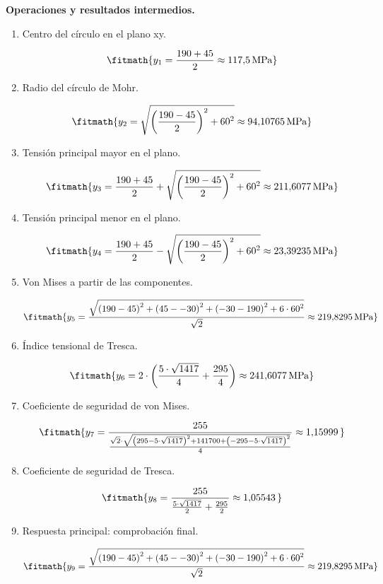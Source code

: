 \noindent\textbf{Operaciones y resultados intermedios.}

\begin{enumerate}

\item Centro del círculo en el plano xy.

\[\fitmath{y_{1}=\frac{190+45}{2}\approx 117{,}5\,\mathrm{MPa}}\]

\item Radio del círculo de Mohr.

\[\fitmath{y_{2}=\sqrt{{\left(\frac{190-45}{2}\right)}^{2}+{60}^{2}}\approx 94{,}10765\,\mathrm{MPa}}\]

\item Tensión principal mayor en el plano.

\[\fitmath{y_{3}=\frac{190+45}{2}+\sqrt{{\left(\frac{190-45}{2}\right)}^{2}+{60}^{2}}\approx 211{,}6077\,\mathrm{MPa}}\]

\item Tensión principal menor en el plano.

\[\fitmath{y_{4}=\frac{190+45}{2}-\sqrt{{\left(\frac{190-45}{2}\right)}^{2}+{60}^{2}}\approx 23{,}39235\,\mathrm{MPa}}\]

\item Von Mises a partir de las componentes.

\[\fitmath{y_{5}=\frac{\sqrt{{\left(190-45\right)}^{2}+{\left(45--30\right)}^{2}+{\left(-30-190\right)}^{2}+6\cdot {60}^{2}}}{\sqrt{2}}\approx 219{,}8295\,\mathrm{MPa}}\]

\item Índice tensional de Tresca.

\[\fitmath{y_{6}=2\cdot \left(\frac{5\cdot \sqrt{1417}}{4}+\frac{295}{4}\right)\approx 241{,}6077\,\mathrm{MPa}}\]

\item Coeficiente de seguridad de von Mises.

\[\fitmath{y_{7}=\frac{255}{\frac{\sqrt{2}\cdot \sqrt{{\left(295-5\cdot \sqrt{1417}\right)}^{2}+141700+{\left(-295-5\cdot \sqrt{1417}\right)}^{2}}}{4}}\approx 1{,}15999\,}\]

\item Coeficiente de seguridad de Tresca.

\[\fitmath{y_{8}=\frac{255}{\frac{5\cdot \sqrt{1417}}{2}+\frac{295}{2}}\approx 1{,}05543\,}\]

\item Respuesta principal: comprobación final.

\[\fitmath{y_{9}=\frac{\sqrt{{\left(190-45\right)}^{2}+{\left(45--30\right)}^{2}+{\left(-30-190\right)}^{2}+6\cdot {60}^{2}}}{\sqrt{2}}\approx 219{,}8295\,\mathrm{MPa}}\]

\end{enumerate}
